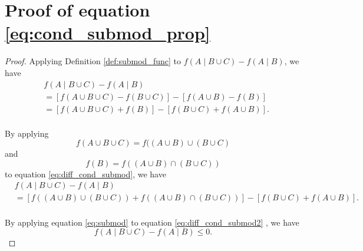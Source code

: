 \documentclass[12pt]{article}
\begin{document}
\section{Proof of equation \ref{eq:cond_submod_prop}} 
\label{app:cond_submod_prop}
\begin{proof}

Applying Definition \ref{def:submod_func} to $ f(A \mid B \cup C) - f(A \mid B) $, we have
\begin{equation}
\label{eq:diff_cond_submod}
\begin{aligned}
& f(A \mid B \cup C) - f(A \mid B) \\
& = \left[ f( A \cup B \cup C ) - f ( B \cup C ) \right]
- \left[ f ( A \cup B ) - f ( B )  \right] \\
& = \left[ f( A \cup B \cup C ) + f ( B ) \right] 
- \left[ f ( B \cup C ) + f ( A \cup B ) \right]. \\
\end{aligned}
\end{equation}

By applying
\begin{equation}
f( A \cup B \cup C ) = f( (A \cup B) \cup (B \cup C)
\end{equation}
and
\begin{equation}
f ( B ) = f ( (A \cup B) \cap (B \cup C) )
\end{equation}
to equation \eqref{eq:diff_cond_submod}, we have
\begin{equation}
\label{eq:diff_cond_submod2}
\begin{aligned}
& f(A \mid B \cup C) - f(A \mid B) \\
& = \left[ f( (A \cup B) \cup (B \cup C) ) + f ( (A \cup B) \cap (B \cup C) )  \right]
- \left[ f ( B \cup C ) + f ( A \cup B ) \right]. \\
\end{aligned}
\end{equation}

By applying equation \eqref{eq:submod} to equation \eqref{eq:diff_cond_submod2} , we have
\begin{equation}
f(A \mid B \cup C) - f(A \mid B) \leq 0.
\end{equation}

\end{proof}
\end{document}

